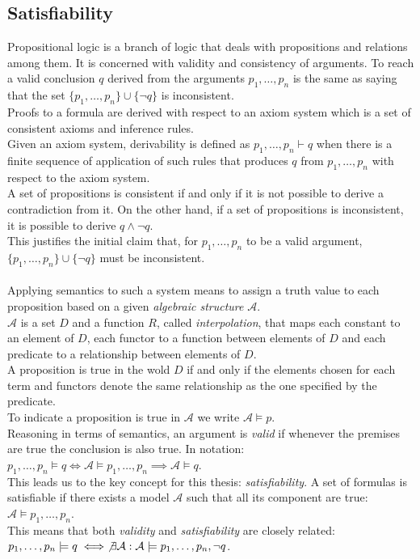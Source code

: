 \subsection*{Satisfiability}

Propositional logic is a branch of logic that deals with propositions and relations among them.
It is concerned with validity and consistency of arguments.
To reach a valid conclusion $q$ derived from the arguments $p_1, \dots, p_n$ is the same as saying that the set $\{p_1, \dots, p_n\} \cup \{\neg q\}$ is inconsistent. \\
Proofs to a formula are derived with respect to an axiom system which is a set of consistent axioms and inference rules. \\
Given an axiom system, derivability is defined as $p_1, \dots, p_n \vdash q$ when there is a finite sequence of application of such rules that produces $q$ from $p_1, \dots, p_n$ with respect to the axiom system. \\
A set of propositions is consistent if and only if it is not possible to derive a contradiction from it.
On the other hand, if a set of propositions is inconsistent, it is possible to derive $q \land \neg q$. \\
This justifies the initial claim that, for $p_1, \dots, p_n$ to be a valid argument, $\{p_1, \dots, p_n\} \cup \{\neg q\}$ must be inconsistent. \\
\\
Applying semantics to such a system means to assign a truth value to each proposition based on a given \textit{algebraic structure} $\mathcal{A}$. \\
$\mathcal{A}$ is a set $D$ and a function $R$, called \textit{interpolation}, that maps each constant to an element of $D$, each functor to a function between elements of $D$ and each predicate to a relationship between elements of $D$. \\
A proposition is true in the wold $D$ if and only if the elements chosen for each term and functors denote the same relationship as the one specified by the predicate. \\
To indicate a proposition is true in $\mathcal{A}$ we write $\mathcal{A} \models p$. \\
Reasoning in terms of semantics, an argument is \textit{valid} if whenever the premises are true the conclusion is also true.
In notation: $p_1, \dots, p_n \models q \iff \mathcal{A} \models p_1, \dots, p_n \implies \mathcal{A} \models q$. \\
This leads us to the key concept for this thesis: \textit{satisfiability}.
A set of formulas is satisfiable if there exists a model $\mathcal{A}$ such that all its component are true: $\mathcal{A} \models p_1, \dots, p_n$. \\
This means that both \textit{validity} and \textit{satisfiability} are closely related: $p_1, \dots, p_n \models q \iff \not\exists \mathcal{A} : \mathcal{A} \models p_1, \dots, p_n, \neg q$. \\

